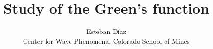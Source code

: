 

\author[E.~D\'{i}az]
{Esteban D\'{i}az \\ 
Center for Wave Phenomena, 
Colorado School of Mines}
\title[A report]{Study of the Green's function}
\maketitle










